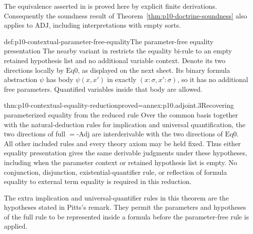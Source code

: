 The equivalence asserted in
\cite[pp.~49, 51, and~55]{Pitts1995Draft} is proved here by
explicit finite derivations. Consequently the soundness result
of Theorem~\ref{thm:p10-doctrine-soundness} also applies to
\(\mathrm{ADJ}\), including interpretations with empty sorts.

\begin{hbdefinition}{def:p10-contextual-parameter-free-equality}{The parameter-free equality presentation}
The nearby variant in \cite[Remark~5.6.2, p.~56]{Pitts1995Draft}
restricts the equality bi-rule to an empty retained hypothesis list
and no additional variable context. Denote its two directions
locally by \(\mathrm{Eq0}\), as displayed on the next sheet.
Its binary formula abstraction \(\psi\) has body
\(\psi(x,x')\) in exactly \((x:\sigma,x':\sigma)\), so it
has no additional free parameters. Quantified variables inside
that body are allowed.
\end{hbdefinition}


\begin{hbtheorem}{thm:p10-contextual-equality-reduction}{proved=annex:p10.adjoint.3}{Recovering parameterized equality from the reduced rule}
Over the common basis together with the natural-deduction rules
for implication and universal quantification, the two directions
of full \(=\)-Adj are interderivable with the two directions of
\(\mathrm{Eq0}\).
All other included rules and every theory axiom may be held fixed.
Thus either equality presentation gives the same derivable
judgments under these hypotheses, including when the parameter
context or retained hypothesis list is empty.
No conjunction, disjunction, existential-quantifier rule, or
reflection of formula equality to external term equality is
required in this reduction.
\end{hbtheorem}

The extra implication and universal-quantifier rules in this
theorem are the hypotheses stated in Pitts's remark. They permit
the parameters and hypotheses of the full rule to be represented
inside a formula before the parameter-free rule is applied.

